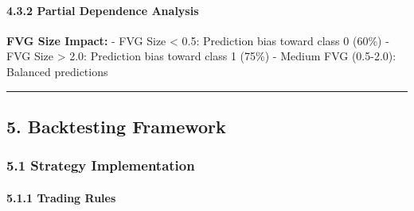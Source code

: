 \paragraph{4.3.2 Partial Dependence
Analysis}\label{partial-dependence-analysis}

\textbf{FVG Size Impact:} - FVG Size \textless{} 0.5: Prediction bias
toward class 0 (60\%) - FVG Size \textgreater{} 2.0: Prediction bias
toward class 1 (75\%) - Medium FVG (0.5-2.0): Balanced predictions

\begin{center}\rule{0.5\linewidth}{0.5pt}\end{center}

\subsection{5. Backtesting Framework}\label{backtesting-framework}

\subsubsection{5.1 Strategy
Implementation}\label{strategy-implementation}

\paragraph{5.1.1 Trading Rules}\label{trading-rules}

